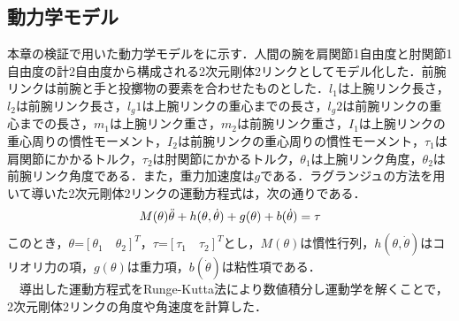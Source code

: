 \begin{small}
\subsection{動力学モデル}
本章の検証で用いた動力学モデルをに示す．人間の腕を肩関節1自由度と肘関節1自由度の計2自由度から構成される2次元剛体2リンクとしてモデル化した．前腕リンクは前腕と手と投擲物の要素を合わせたものとした．$l_{1}$は上腕リンク長さ，$l_{2}$は前腕リンク長さ，$l_g{1}$は上腕リンクの重心までの長さ，$l_g{2}$は前腕リンクの重心までの長さ，$m_{1}$は上腕リンク重さ，$m_{2}$は前腕リンク重さ，$I_{1}$は上腕リンクの重心周りの慣性モーメント，$I_{2}$は前腕リンクの重心周りの慣性モーメント，$\tau_{1}$は肩関節にかかるトルク，$\tau_{2}$は肘関節にかかるトルク，$\theta_{1}$は上腕リンク角度，$\theta_{2}$は前腕リンク角度である．また，重力加速度は$g$である．ラグランジュの方法を用いて導いた2次元剛体2リンクの運動方程式は，次の通りである．
\begin{eqnarray}
  \equlabel{5}
  M(\theta)\ddot{\theta} + h(\theta, \dot{\theta}) + g(\theta) + b(\dot{\theta}) = \tau
\end{eqnarray}
このとき，$\theta$=${[\theta_{1} \quad \theta_{2}]}^T$，$\tau$=${[\tau_{1} \quad \tau_{2}]}^T$とし，$M(\theta)$は慣性行列，$h(\theta, \dot{\theta})$はコリオリ力の項，$g(\theta)$は重力項，$b(\dot{\theta})$は粘性項である．\\
　導出した運動方程式をRunge-Kutta法\cite{runge-kutta}により数値積分し運動学を解くことで，2次元剛体2リンクの角度や角速度を計算した．

\end{small}
